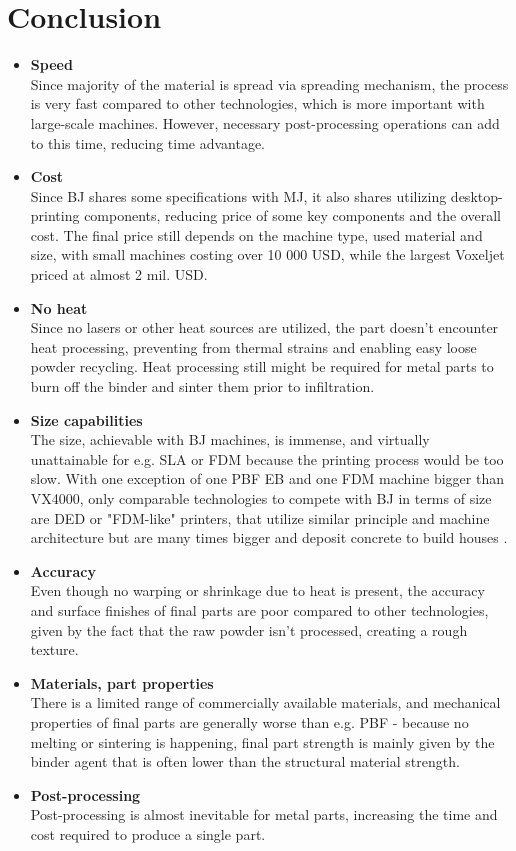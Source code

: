 \documentclass[a4paper, twoside, 11pt]{report}
\newcommand\pro{\item[$+$]}
\newcommand\con{\item[$-$]}
\begin{document}
\section{Conclusion}
\begin{itemize}

\pro \textbf{Speed}\\
Since majority of the material is spread via spreading mechanism, the process is very fast compared to other technologies, which is more important with large-scale machines. However, necessary post-processing operations can add to this time, reducing time advantage.

\pro \textbf{Cost}\\
Since BJ shares some specifications with MJ, it also shares utilizing desktop-printing components, reducing price of some key components and the overall cost. The final price still depends on the machine type, used material and size, with small machines costing over 10 000 USD, while the largest Voxeljet priced at almost 2 mil. USD.

\pro \textbf{No heat}\\
Since no lasers or other heat sources are utilized, the part doesn't encounter heat processing, preventing from thermal strains and enabling easy loose powder recycling. Heat processing still might be required for metal parts to burn off the binder and sinter them prior to infiltration.

\pro \textbf{Size capabilities}\\
The size, achievable with BJ machines, is immense, and virtually unattainable for e.g. SLA or FDM because the printing process would be too slow. With one exception of one PBF EB and one FDM machine bigger than VX4000, only comparable technologies to compete with BJ in terms of size are DED or "FDM-like" printers, that utilize similar principle and machine architecture but are many times bigger and deposit concrete to build houses \cite{BigPrinters}.
\\[10pt]

\con \textbf{Accuracy}\\
Even though no warping or shrinkage due to heat is present, the accuracy and surface finishes of final parts are poor compared to other  technologies, given by the fact that the raw powder isn't processed, creating a rough texture.

\con \textbf{Materials, part properties}\\
There is a limited range of commercially available materials, and mechanical properties of final parts are generally worse than e.g. PBF - because no melting or sintering is happening, final part strength is mainly given by the binder agent that is often lower than the structural material strength.

\con \textbf{Post-processing}\\
Post-processing is almost inevitable for metal parts, increasing the time and cost required to produce a single part.
\end{itemize}
\end{document}

